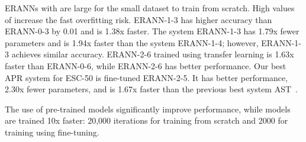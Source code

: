 \documentclass{article}
\begin{document}
\begin{sloppy}
\vspace{-1.5em}
\begin{table}[h!]
  \caption{Comparison of the computational complexity and the performance of ERANNs on ESC-50}
  \centering
  \label{tab:tableeffesc}
\end{table}


ERANNs with  are large for the small dataset to train from scratch. High values of  increase the fast overfitting risk. \mbox{ERANN-1-3} has higher accuracy than \mbox{ERANN-0-3} by 0.01 and is 1.38x faster. The system \mbox{ERANN-1-3} has 1.79x fewer parameters and is 1.94x faster than the system \mbox{ERANN-1-4}; however, \mbox{ERANN-1-3} achieves similar accuracy. \mbox{ERANN-2-6} trained using transfer learning is 1.63x faster than \mbox{ERANN-0-6}, while \mbox{ERANN-2-6} has better performance. Our best APR system for ESC-50 is fine-tuned \mbox{ERANN-2-5}. It has better performance, 2.30x fewer parameters, and is 1.67x faster than the previous best system AST~\cite{gong21b_interspeech}.

The use of pre-trained models significantly improve performance, while models are trained 10x faster: 20,000 iterations for training from scratch and 2000 for training using fine-tuning.


\end{sloppy}
\end{document}
